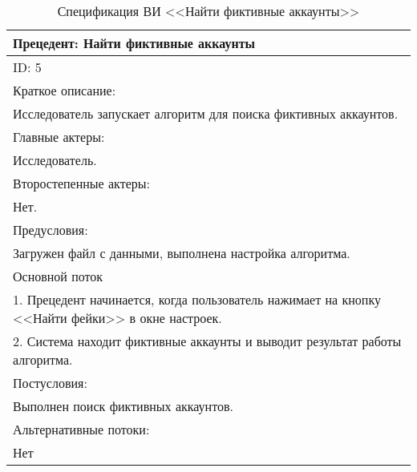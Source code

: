 \begin{table}[H]
    \caption{Спецификация ВИ <<Найти фиктивные аккаунты>>}
    \vspace{1em}
    \small
    \begin{tabular}{|p{15cm}|}
       \hline
        Прецедент: Найти фиктивные аккаунты\\ \hline
        ID: 5\\ \hline
        Краткое описание: \\ Исследователь запускает алгоритм для поиска фиктивных аккаунтов. \\ \hline
        Главные актеры: \\ Исследователь.\\ \hline
        Второстепенные актеры:\\ Нет. \\ \hline
        Предусловия: \\ Загружен файл с данными, выполнена настройка алгоритма. \\ \hline
        Основной поток\\ 
        1. Прецедент начинается, когда пользователь нажимает на кнопку <<Найти фейки>> в окне настроек. \\ 
        2. Система находит фиктивные аккаунты и выводит результат работы алгоритма. \\  \hline
        Постусловия: \\ Выполнен поиск фиктивных аккаунтов. \\ \hline
        Альтернативные потоки: \\ Нет \\ \hline
        \end{tabular} 
    \label{tab:SearchFake}
\end{table}
\vspace{2em}

